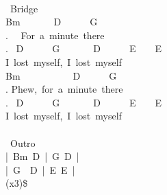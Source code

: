 {\\
\lbrack\ Bridge\rbrack\\
Bm\ \ \ \ \ \ \ D\ \ \ \ \ \ G\\
. \ \ For\ a\ minute\ there\\
. \ D\ \ \ \ \ \ G\ \ \ \ \ \ \ D\ \ \ \ \ \ E\ \ \ \ E\\
I\ lost\ myself,\ I\ lost\ myself\\
Bm\ \ \ \ \ \ \ \ \ \ \ D\ \ \ \ \ \ G\\
. Phew,\ for\ a\ minute\ there\\
. \ D\ \ \ \ \ \ G\ \ \ \ \ \ \ D\ \ \ \ \ \ E\ \ \ \ E\\
I\ lost\ myself,\ I\ lost\ myself\\
\\
\lbrack\ Outro\rbrack\\
|\ Bm\ D\ |\ G\ D\ |\\
|\ G\ \ D\ |\ E\ E\ |\\
(x3)\$}
